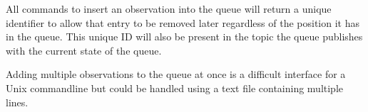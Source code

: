 \documentclass[TS,toc,lsstdraft]{lsstdoc}
\begin{document}
All commands to insert an observation into the queue will return a unique identifier to allow that entry to be removed later regardless of the position it has in the queue.
This unique ID will also be present in the topic the queue publishes with the current state of the queue.

Adding multiple observations to the queue at once is a difficult interface for a Unix commandline but could be handled using a text file containing multiple lines.
\end{document}
